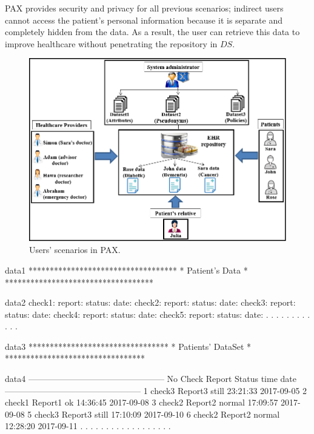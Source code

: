 \documentclass[journal,article,submit,moreauthors,pdftex]{Definitions/mdpi}
\begin{document}
PAX provides security and privacy for all previous scenarios; indirect users cannot access the patient's personal information because it is separate and completely hidden from the data. As a result, the user can retrieve this data to improve healthcare without penetrating the repository in $DS$.
\begin{figure}[ht!]
\centering
  \includegraphics[width=13 cm,height=8cm]{scenarios.png}
	\caption{Users' scenarios in PAX.}
	\label{fig:scenarios}
\end{figure}
\begin{SaveVerbatim}{data1}
   ***********************************
   *         Patient's Data          *
   ***********************************
\end{SaveVerbatim}
\begin{SaveVerbatim}{data2}
check1:    report:    status:    date:
check2:    report:    status:    date:
check3:    report:    status:    date:
check4:    report:    status:    date:
check5:    report:    status:    date:
  .          .          .          .
  .          .          .          .
  .          .          .          .
\end{SaveVerbatim}
\begin{SaveVerbatim}{data3}
        *********************************
        *      Patients' DataSet        *
        *********************************
\end{SaveVerbatim}
\begin{SaveVerbatim}{data4}
------------------------------------------------
No Check   Report   Status  time      date
------------------------------------------------
1  check3  Report3  still   23:21:33  2017-09-05
2  check1  Report1  ok      14:36:45  2017-09-08
3  check2  Report2  normal  17:09:57  2017-09-08
5  check3  Report3  still   17:10:09  2017-09-10
6  check2  Report2  normal  12:28:20  2017-09-11
.    .       .        .         .           .
.    .       .        .         .           .
.    .       .        .         .           .
\end{SaveVerbatim}
\end{document}
